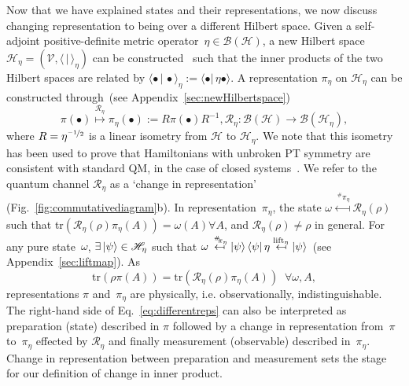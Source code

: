 \documentclass[amsmath,amssymb,aps,pra,superscriptaddress,twocolumn]{revtex4-2}
\begin{document}
Now that we have explained states and their representations,
we now discuss changing representation
to being over a different Hilbert space.
Given a self-adjoint positive-definite metric operator~$\eta\in\mathcal{B}(\mathscr{H})$,
a new Hilbert space~$\mathscr{H}_\eta = (\mathscr{V},\langle\,\vert\,\rangle_\eta)$ can be constructed~\cite{SGH92} 
such that the inner products of the two Hilbert spaces are related by
$\langle \bullet\,\vert\,\bullet\rangle_\eta := \langle\bullet\vert\,\eta\bullet\rangle$.
A representation $\pi_{\eta}$ on $\mathscr{H}_{\eta}$ can be constructed 
through~(see Appendix~\ref{sec:newHilbertspace})
\begin{equation}
\pi(\bullet)\stackrel{\mathcal{R}_{\eta}}{\mapsto}\pi_{\eta}(\bullet):=R\pi(\bullet)R^{-1},
\mathcal{R}_\eta:\mathcal{B}(\mathscr H)\to\mathcal{B}(\mathscr H_\eta),
\end{equation}
where $R = \eta^{\nicefrac{-1}{2}}$ is a linear isometry from $\mathscr H$ to $\mathscr H_\eta$.
We note that this isometry has been used to prove that Hamiltonians with unbroken PT symmetry 
are consistent with standard QM, in the case of closed systems~\cite{GS08a,Mos10a,Mos10b,Zno15,Cro15}.
We refer to the quantum channel $\mathcal{R}_{\eta}$ as a `change in representation' (Fig.~\ref{fig:commutativediagram}b).
In representation~$\pi_{\eta}$, the state $\omega\stackrel{\;{}^{\#}\!\!\pi_{\eta}}{\mapsfrom}\mathcal{R}_{\eta}(\rho)$ 
such that tr$(\mathcal{R}_{\eta}(\rho)\pi_{\eta}(A)) = \omega(A)\forall A$,
and $\mathcal{R}_{\eta}(\rho) \ne \rho$ in general. 
For any pure state~$\omega$, $\exists\ket\psi \in \mathscr{H}_{\eta}$ such that $\omega\stackrel{\;{}^{\#}\!\!\pi_{\eta}}{\mapsfrom}\ket{\psi}\bra{\psi}
\eta\stackrel{\operatorname{lift}_{\eta}}{\mapsfrom}\ket{\psi}$~(see Appendix~\ref{sec:liftmap}).
As 
\begin{equation}
\label{eq:differentreps}
    \text{tr}(\rho \pi(A)) = \text{tr}(\mathcal{R}_{\eta}(\rho) \pi_\eta(A)) \;\;\forall \omega,A,
\end{equation}
representations $\pi$ and~$\pi_{\eta}$ are physically,
i.e. observationally, indistinguishable. 
The right-hand side of Eq.~\eqref{eq:differentreps} 
can also be interpreted as preparation (state) described in $\pi$
followed by a change in representation from~$\pi$ to~$\pi_\eta$ 
effected by $\mathcal{R}_{\eta}$ and finally measurement (observable) described in~$\pi_\eta$.
Change in representation between preparation and measurement sets the stage for 
our definition of change in inner product. 
\end{document}
